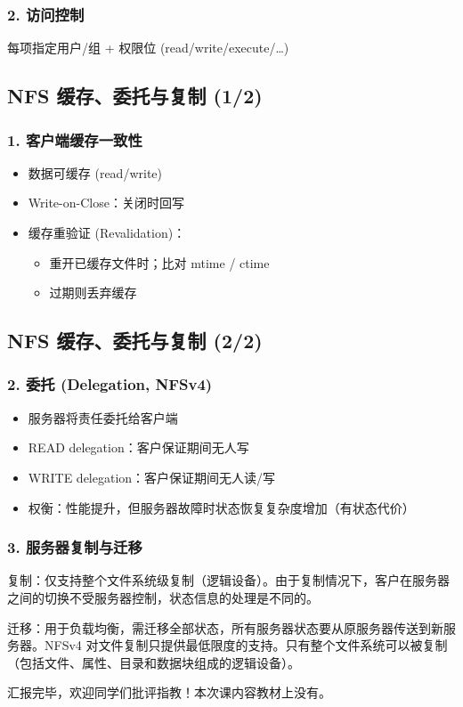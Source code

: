 \subsubsection{2. 访问控制}
每项指定用户/组 + 权限位 (read/write/execute/…)


\subsection{NFS 缓存、委托与复制 (1/2)}

\subsubsection{1. 客户端缓存一致性}
\begin{itemize}
    \item 数据可缓存 (read/write)
    \item Write-on-Close：关闭时回写
    \item 缓存重验证 (Revalidation)：
    \begin{itemize}
        \item 重开已缓存文件时；比对 mtime / ctime
        \item 过期则丢弃缓存
    \end{itemize}
\end{itemize}


\subsection{NFS 缓存、委托与复制 (2/2)}

\subsubsection{2. 委托 (Delegation, NFSv4)}
\begin{itemize}
    \item 服务器将责任委托给客户端
    \item READ delegation：客户保证期间无人写
    \item WRITE delegation：客户保证期间无人读/写
    \item 权衡：性能提升，但服务器故障时状态恢复复杂度增加（有状态代价）
\end{itemize}

\subsubsection{3. 服务器复制与迁移}
复制：仅支持整个文件系统级复制（逻辑设备）。由于复制情况下，客户在服务器之间的切换不受服务器控制，状态信息的处理是不同的。

迁移：用于负载均衡，需迁移全部状态，所有服务器状态要从原服务器传送到新服务器。NFSv4 对文件复制只提供最低限度的支持。只有整个文件系统可以被复制（包括文件、属性、目录和数据块组成的逻辑设备）。

\medskip
汇报完毕，欢迎同学们批评指教！本次课内容教材上没有。
